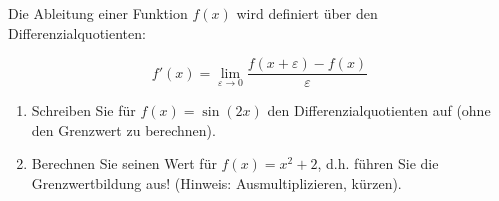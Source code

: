 \item Die Ableitung einer Funktion $f(x)$ wird definiert über den Differenzialquotienten:

$$f'(x) = \lim\limits_{\varepsilon\to 0} \frac{f(x+\varepsilon)-f(x)}{\varepsilon}$$

\begin{enumerate}
\item Schreiben Sie für $f(x)=\sin(2x)$ den Differenzialquotienten auf (ohne den Grenzwert zu berechnen).
\item Berechnen Sie seinen Wert für $f(x)=x^2+2$, d.h. führen Sie die Grenzwertbildung aus! (Hinweis: Ausmultiplizieren, kürzen).
\end{enumerate}

